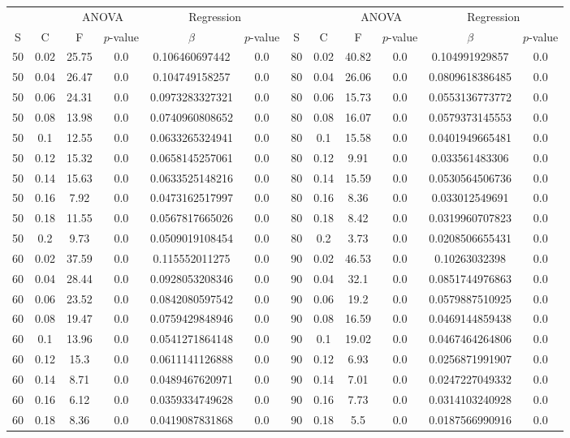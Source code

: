 \documentclass[12pt]{article}
\begin{document}
\begin{spacing}{2.0}
\begin{table}[]
    \centering
    \begin{tabular}{c c | c c | c c || c c | c c | c c |}
&&\multicolumn{2}{c|}{ANOVA}&\multicolumn{2}{c||}{Regression}&&&\multicolumn{2}{c|}{ANOVA}&\multicolumn{2}{c|}{Regression}\\
S&C&F&$p$-value&$\beta$&$p$-value&S&C&F&$p$-value&$\beta$&$p$-value\\
\hline50&0.02&25.75&0.0&0.106460697442&0.0&80&0.02&40.82&0.0&0.104991929857&0.0\\
50&0.04&26.47&0.0&0.104749158257&0.0&80&0.04&26.06&0.0&0.0809618386485&0.0\\
50&0.06&24.31&0.0&0.0973283327321&0.0&80&0.06&15.73&0.0&0.0553136773772&0.0\\
50&0.08&13.98&0.0&0.0740960808652&0.0&80&0.08&16.07&0.0&0.0579373145553&0.0\\
50&0.1&12.55&0.0&0.0633265324941&0.0&80&0.1&15.58&0.0&0.0401949665481&0.0\\
50&0.12&15.32&0.0&0.0658145257061&0.0&80&0.12&9.91&0.0&0.033561483306&0.0\\
50&0.14&15.63&0.0&0.0633525148216&0.0&80&0.14&15.59&0.0&0.0530564506736&0.0\\
50&0.16&7.92&0.0&0.0473162517997&0.0&80&0.16&8.36&0.0&0.033012549691&0.0\\
50&0.18&11.55&0.0&0.0567817665026&0.0&80&0.18&8.42&0.0&0.0319960707823&0.0\\
50&0.2&9.73&0.0&0.0509019108454&0.0&80&0.2&3.73&0.0&0.0208506655431&0.0\\
60&0.02&37.59&0.0&0.115552011275&0.0&90&0.02&46.53&0.0&0.10263032398&0.0\\
60&0.04&28.44&0.0&0.0928053208346&0.0&90&0.04&32.1&0.0&0.0851744976863&0.0\\
60&0.06&23.52&0.0&0.0842080597542&0.0&90&0.06&19.2&0.0&0.0579887510925&0.0\\
60&0.08&19.47&0.0&0.0759429848946&0.0&90&0.08&16.59&0.0&0.0469144859438&0.0\\
60&0.1&13.96&0.0&0.0541271864148&0.0&90&0.1&19.02&0.0&0.0467464264806&0.0\\
60&0.12&15.3&0.0&0.0611141126888&0.0&90&0.12&6.93&0.0&0.0256871991907&0.0\\
60&0.14&8.71&0.0&0.0489467620971&0.0&90&0.14&7.01&0.0&0.0247227049332&0.0\\
60&0.16&6.12&0.0&0.0359334749628&0.0&90&0.16&7.73&0.0&0.0314103240928&0.0\\
60&0.18&8.36&0.0&0.0419087831868&0.0&90&0.18&5.5&0.0&0.0187566990916&0.0\\

\end{tabular}
\end{table}
\end{spacing}
\end{document}
